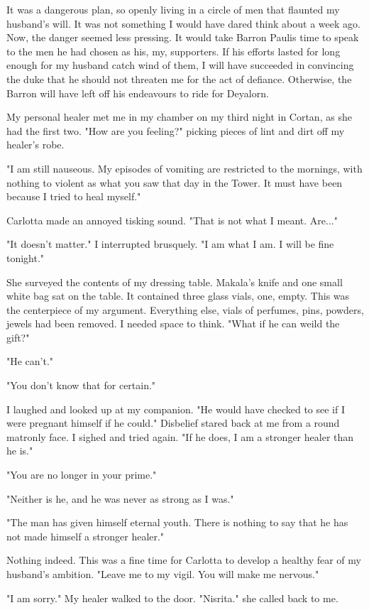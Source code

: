 \documentclass{article}
\begin{document}
It was a dangerous plan, so openly living in a circle of men that flaunted my husband's will. It was not something I would have dared think about a week ago. Now, the danger seemed less pressing. It would take Barron Paulis time to speak to the men he had chosen as his, my, supporters. If his efforts lasted for long enough for my husband catch wind of them, I will  have succeeded in convincing the duke that he should not threaten me for the act of defiance. Otherwise, the Barron will have left off his endeavours to ride for Deyalorn.

My personal healer met me in my chamber on my third night in Cortan, as she had the first two. "How are you feeling?" picking pieces of lint and dirt off my healer's robe.

"I am still nauseous. My episodes of vomiting are restricted to the mornings, with nothing to violent as what you saw that day in the Tower. It must have been because I tried to heal myself."

Carlotta made an annoyed tisking sound. "That is not what I meant. Are..."

"It doesn't matter." I interrupted brusquely. "I am what I am. I will be fine tonight."

She surveyed the contents of my dressing table. Makala's knife and one small white bag sat on the table. It contained three glass vials, one, empty. This was the centerpiece of my argument. Everything else, vials of perfumes, pins, powders, jewels had been removed. I needed space to think. "What if he can weild the gift?"

"He can't."

"You don't know that for certain."

I laughed and looked up at my companion. "He would have checked to see if I were pregnant himself if he could." Disbelief stared back at me from a round matronly face. I sighed and tried again. "If he does, I am a stronger healer than he is."

"You are no longer in your prime."

"Neither is he, and he was never as strong as I was."

"The man has given himself eternal youth. There is nothing to say that he has not made himself a stronger healer."

Nothing indeed. This was a fine time for Carlotta to develop a healthy fear of my husband's ambition. "Leave me to my vigil. You will make me nervous."

"I am sorry." My healer walked to the door. "Nisrita." she called back to me.
\end{document}
